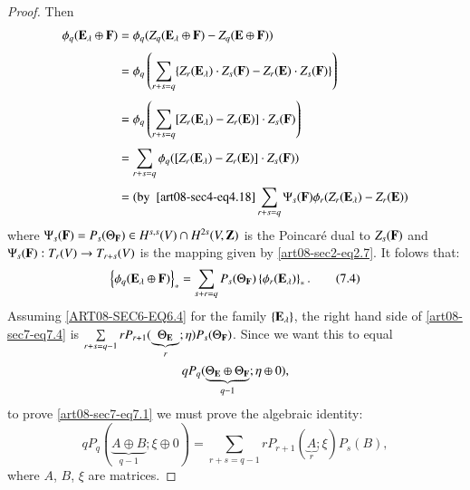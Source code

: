\begin{proof}
Then\pageoriginale
\begin{align*}
\phi_{q}(\mathbf{E}_{\lambda}\oplus\mathbf{F}) &= \phi_{q}(Z_{q}(\mathbf{E}_{\lambda}\oplus\mathbf{F})-Z_{q}(\mathbf{E}\oplus \mathbf{F}))\\[3pt]
&= \phi_{q}\left(\sum\limits_{r+s=q}\{Z_{r}(\mathbf{E}_{\lambda})\cdot Z_{s}(\mathbf{F})-Z_{r}(\mathbf{E})\cdot Z_{s}(\mathbf{F})\}\right)\\[3pt]
&= \phi_{q}\left(\sum\limits_{r+s=q}[Z_{r}(\mathbf{E}_{\lambda})-Z_{r}(\mathbf{E})]\cdot Z_{s}(\mathbf{F})\right)\\[3pt]
&= \sum\limits_{r+s=q}\phi_{q}([Z_{r}(\mathbf{E}_{\lambda})-Z_{r}(\mathbf{E})]\cdot Z_{s}(\mathbf{F}))\\[3pt]
&= (\text{by~ } \eqref{art08-sec4-eq4.18} \sum\limits_{r+s=q}\Psi_{s}(\mathbf{F})\phi_{r}(Z_{r}(\mathbf{E}_{\lambda})-Z_{r}(\mathbf{E}))
\end{align*}
where $\Psi_{s}(\mathbf{F})=P_{s}(\Theta_{\mathbf{F}})\in H^{s,s}(V)\cap H^{2s}(V,\mathbf{Z})$ is the Poincar\'e dual to $Z_{s}(\mathbf{F})$ and $\Psi_{s}(\mathbf{F}):T_{r}(V)\to T_{r+s}(V)$ is the mapping given by \eqref{art08-sec2-eq2.7}. It folows that:
\begin{equation*}
\left\{\phi_{q}(\mathbf{E}_{\lambda}\oplus \mathbf{F})\right\}_{*}=\sum\limits_{s+r=q}P_{s}(\Theta_{\mathbf{F}})\left\{\phi_{r}(\mathbf{E}_{\lambda})\right\}_{*}.\tag{7.4}\label{art08-sec7-eq7.4}
\end{equation*}
Assuming \eqref{ART08-SEC6-EQ6.4} for the family $\{\mathbf{E}_{\lambda}\}$, the right hand side of \eqref{art08-sec7-eq7.4} is $\sum\limits_{r+s=q-1}rP_{r+1}(\underbrace{\Theta_{\mathbf{E}}}_{r};\eta)P_{s}(\Theta_{\mathbf{F}})$. Since we want this to equal 
$$
qP_{q}(\underbrace{\Theta_{\mathbf{E}}\oplus \Theta_{\mathbf{F}}}_{q-1};\eta\oplus 0),
$$ 
to prove \eqref{art08-sec7-eq7.1} we must prove the algebraic identity:
\begin{equation*}
qP_{q}(\underbrace{A\oplus B}_{q-1};\xi\oplus 0)=\sum\limits_{r+s=q-1}rP_{r+1}(\underbrace{A}_{r};\xi)P_{s}(B),\tag{7.5}\label{art08-sec7-eq7.5}
\end{equation*}
where $A$, $B$, $\xi$ are matrices.


\end{proof}
